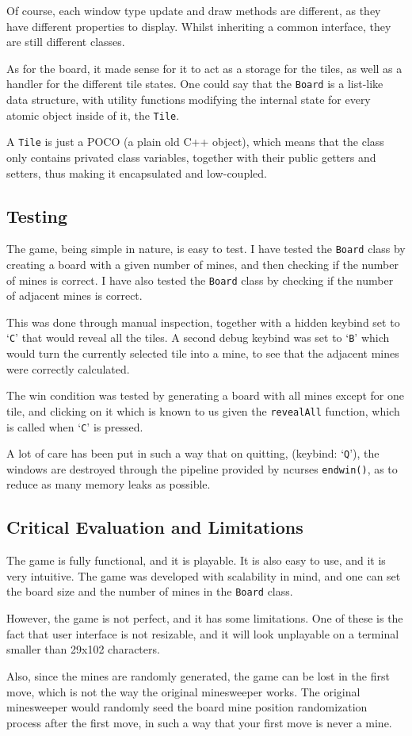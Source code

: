 \documentclass{article}
\newcommand{\code}[1]{\texttt{#1}}
\begin{document}
Of course, each window type update and draw methods are different, as they have different
properties to display. Whilst inheriting a common interface, they are still
different classes.

As for the board, it made sense for it to act as a storage for the tiles, as well as a 
handler for the different tile states. One could say that the \code{Board} is a list-like data structure, 
with utility functions modifying the internal state for every atomic object inside of it, the \code{Tile}.

A \code{Tile} is just a POCO (a plain old C++ object), which means that the
class only contains privated class variables, together with their public 
getters and setters, thus making it encapsulated and low-coupled.


\subsection{Testing}

The game, being simple in nature, is easy to test. I have tested
the \code{Board} class by creating a board with a given number of mines, and
then checking if the number of mines is correct. I have also tested the
\code{Board} class by checking if the number of adjacent mines is correct.

This was done through manual inspection, together with a hidden keybind set to `\code{C}' that would reveal all the tiles.
A second debug keybind was set to `\code{B}' which would turn the currently selected tile into a mine, 
to see that the adjacent mines were correctly calculated.

The win condition was tested by generating a board with all mines except for one tile, and clicking on it
which is known to us given the \code{revealAll} function, which is called when `\code{C}' is pressed.

A lot of care has been put in such a way that on quitting, (keybind: `\code{Q}'), the windows are destroyed 
through the pipeline provided by ncurses \code{endwin()}, as to reduce as many memory leaks as possible.

\subsection{Critical Evaluation and Limitations}

The game is fully functional, and it is playable. It is also easy to use, and
it is very intuitive. The game was developed with scalability in mind, and one can set 
the board size and the number of mines in the \code{Board} class.

However, the game is not perfect, and it has some limitations. One of these is the fact that
user interface is not resizable, and it will look unplayable on a terminal smaller than
29x102 characters.

Also, since the mines are randomly generated, the game can be lost in the first move, which is not the way 
the original minesweeper works. The original minesweeper would randomly seed the board mine position randomization process
after the first move, in such a way that your first move is never a mine.

\newpage
\end{document}
